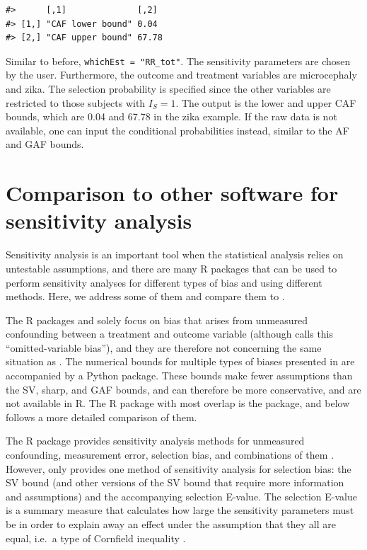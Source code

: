 \begin{verbatim}
#>      [,1]              [,2] 
#> [1,] "CAF lower bound" 0.04 
#> [2,] "CAF upper bound" 67.78
\end{verbatim}

Similar to before, \texttt{whichEst\ =\ "RR\_tot"}. The sensitivity parameters are chosen
by the user. Furthermore, the outcome and treatment variables are microcephaly
and zika. The selection probability is specified since the other variables are
restricted to those subjects with \(I_S=1\). The output is the lower and upper
CAF bounds, which are 0.04 and 67.78 in the zika example. If the raw data is not
available, one can input the conditional probabilities instead, similar to the
AF and GAF bounds.

\section{Comparison to other software for sensitivity analysis}\label{comparison-to-other-software-for-sensitivity-analysis}

Sensitivity analysis is an important tool when the statistical analysis relies on
untestable assumptions, and there are many R packages that can be used to
perform sensitivity analyses for different types of bias and using
different methods. Here, we address some of them and compare them to
.

The R packages  \citep{mcgowan2022tipr} and 
\citep{sensemakr2024} solely focus on bias that arises from unmeasured confounding
between a treatment and outcome variable (although  calls
this ``omitted-variable bias''), and they are therefore not concerning the same
situation as . The numerical bounds for multiple types of
biases presented in \citet{duarte2024automated} are accompanied by a Python package.
These bounds make fewer assumptions than the SV, sharp, and GAF bounds, and can
therefore be more conservative, and are not available in R. The R package with
most overlap is the  package, and below follows a more detailed
comparison of them.

The R package  provides sensitivity analysis methods for
unmeasured confounding, measurement error, selection bias, and combinations of
them \citep{ding2017sensitivity, mathur2020sensitivity}. However, 
only provides one method of sensitivity analysis for selection bias: the SV
bound (and other versions of the SV bound that require more information and
assumptions) and the accompanying selection E-value. The selection E-value is a
summary measure that calculates how large the sensitivity parameters must be in
order to explain away an effect under the assumption that they all are equal,
i.e.~a type of Cornfield inequality \citep{cornfield1959smoking}.

